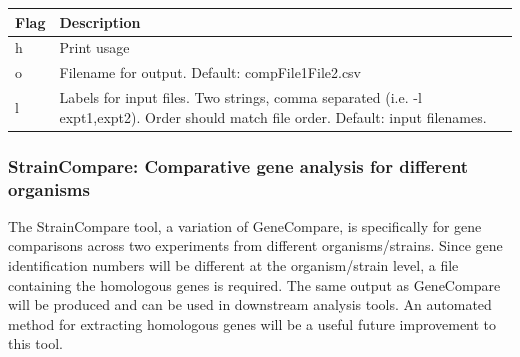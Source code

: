 \documentclass[11pt,]{article}
\begin{document}
\begin{longtable}[]{@{}ll@{}}
\toprule
\begin{minipage}[b]{0.06\columnwidth}\raggedright\strut
Flag\strut
\end{minipage} & \begin{minipage}[b]{0.88\columnwidth}\raggedright\strut
Description\strut
\end{minipage}\tabularnewline
\midrule
\endhead
\begin{minipage}[t]{0.06\columnwidth}\raggedright\strut
h\strut
\end{minipage} & \begin{minipage}[t]{0.88\columnwidth}\raggedright\strut
Print usage\strut
\end{minipage}\tabularnewline
\begin{minipage}[t]{0.06\columnwidth}\raggedright\strut
o\strut
\end{minipage} & \begin{minipage}[t]{0.88\columnwidth}\raggedright\strut
Filename for output. Default: compFile1File2.csv\strut
\end{minipage}\tabularnewline
\begin{minipage}[t]{0.06\columnwidth}\raggedright\strut
l\strut
\end{minipage} & \begin{minipage}[t]{0.88\columnwidth}\raggedright\strut
Labels for input files. Two strings, comma separated (i.e. -l
expt1,expt2). Order should match file order. Default: input
filenames.\strut
\end{minipage}\tabularnewline
\bottomrule
\end{longtable}

\subsubsection{StrainCompare: Comparative gene analysis for different
organisms}\label{straincompare-comparative-gene-analysis-for-different-organisms}

The StrainCompare tool, a variation of GeneCompare, is specifically for
gene comparisons across two experiments from different
organisms/strains. Since gene identification numbers will be different
at the organism/strain level, a file containing the homologous genes is
required. The same output as GeneCompare will be produced and can be
used in downstream analysis tools. An automated method for extracting
homologous genes will be a useful future improvement to this tool.
\end{document}

